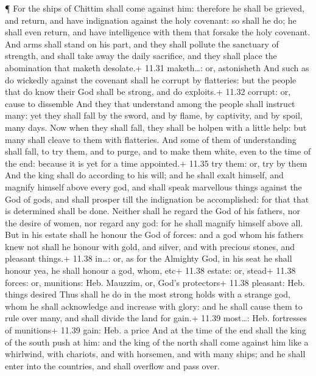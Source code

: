  ¶ For the ships of Chittim shall come against him:
therefore he shall be grieved, and return, and have indignation against
the holy covenant: so shall he do; he shall even return, and have
intelligence with them that forsake the holy covenant.  And
arms shall stand on his part, and they shall pollute the sanctuary of
strength, and shall take away the daily sacrifice, and they shall place
the abomination that maketh desolate.+ 11.31 maketh\ldots: or,
astonisheth  And such as do wickedly against the covenant
shall he corrupt by flatteries: but the people that do know their God
shall be strong, and do exploits.+ 11.32 corrupt: or, cause to dissemble
 And they that understand among the people shall instruct
many: yet they shall fall by the sword, and by flame, by captivity, and
by spoil, many days.  Now when they shall fall, they shall
be holpen with a little help: but many shall cleave to them with
flatteries.  And some of them of understanding shall fall,
to try them, and to purge, and to make them white, even to the time of
the end: because it is yet for a time appointed.+ 11.35 try them: or,
try by them  And the king shall do according to his will;
and he shall exalt himself, and magnify himself above every god, and
shall speak marvellous things against the God of gods, and shall prosper
till the indignation be accomplished: for that that is determined shall
be done.  Neither shall he regard the God of his fathers,
nor the desire of women, nor regard any god: for he shall magnify
himself above all.  But in his estate shall he honour the
God of forces: and a god whom his fathers knew not shall he honour with
gold, and silver, and with precious stones, and pleasant things.+ 11.38
in\ldots: or, as for the Almighty God, in his seat he shall honour yea,
he shall honour a god, whom, etc+ 11.38 estate: or, stead+ 11.38 forces:
or, munitions: Heb. Mauzzim, or, God's protectors+ 11.38 pleasant: Heb.
things desired  Thus shall he do in the most strong holds
with a strange god, whom he shall acknowledge and increase with glory:
and he shall cause them to rule over many, and shall divide the land for
gain.+ 11.39 most\ldots: Heb. fortresses of munitions+ 11.39 gain: Heb.
a price  And at the time of the end shall the king of the
south push at him: and the king of the north shall come against him like
a whirlwind, with chariots, and with horsemen, and with many ships; and
he shall enter into the countries, and shall overflow and pass over.
